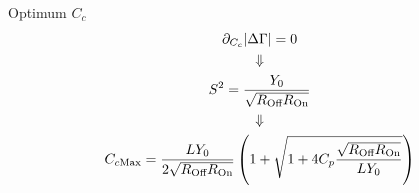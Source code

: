 \documentclass[../main.tex]{subfiles}
\begin{document}
%
%
%

\begin{frame}{Optimum \(C_{c}\)}
\begin{gather*}
    \partial_{C_{c}} |\Delta\Gamma| = 0\\
    \Downarrow\\
    S^2 = \frac{Y_{0}}{\sqrt{R_{\text{Off}}R_{\text{On}}}}\\
    \Downarrow\\
    C_{c\text{Max}} = \frac{L Y_{0}}{2\sqrt{R_{\text{Off}}R_{\text{On}}}}
    \left(1 + \sqrt{1 + 4C_{p}\frac{\sqrt{R_{\text{Off}}R_{\text{On}}}}{LY_{0}}}\right)
\end{gather*}
\end{frame}

%
%
%
%
%
%
\end{document}
